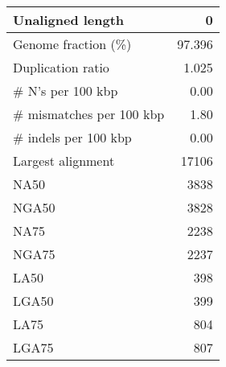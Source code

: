 \documentclass[12pt,a4paper]{article}
\begin{document}
\begin{table}[ht]
\begin{center}
\begin{tabular}{|l*{1}{|r}|}
Unaligned length & 0 \\ \hline
Genome fraction (\%) & 97.396 \\ \hline
Duplication ratio & 1.025 \\ \hline
\# N's per 100 kbp & 0.00 \\ \hline
\# mismatches per 100 kbp & 1.80 \\ \hline
\# indels per 100 kbp & 0.00 \\ \hline
Largest alignment & 17106 \\ \hline
NA50 & 3838 \\ \hline
NGA50 & 3828 \\ \hline
NA75 & 2238 \\ \hline
NGA75 & 2237 \\ \hline
LA50 & 398 \\ \hline
LGA50 & 399 \\ \hline
LA75 & 804 \\ \hline
LGA75 & 807 \\ \hline
\end{tabular}
\end{center}
\end{table}
\end{document}

